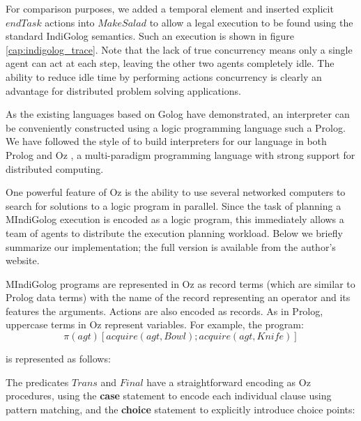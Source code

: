\documentclass[times, 10pt, twocolumn]{article}
\begin{document}
For comparison purposes, we added a temporal element and inserted
explicit $endTask$ actions into $MakeSalad$ to allow a legal execution
to be found using the standard IndiGolog semantics. Such an execution
is shown in figure \ref{cap:indigolog_trace}. Note that the lack
of true concurrency means only a single agent can act at each step,
leaving the other two agents completely idle. The ability to reduce
idle time by performing actions concurrency is clearly an advantage
for distributed problem solving applications.



As the existing languages based on Golog have demonstrated, an interpreter
can be conveniently constructed using a logic programming language
such a Prolog. We have followed the style of \cite{giacomo00congolog,giacomo99indigolog}
to build interpreters for our language in both Prolog and Oz \cite{vanroy03mozart_logic},
a multi-paradigm programming language with strong support for distributed
computing.

One powerful feature of Oz is the ability to use several networked
computers to search for solutions to a logic program in parallel.
Since the task of planning a MIndiGolog execution is encoded as a
logic program, this immediately allows a team of agents to distribute
the execution planning workload. Below we briefly summarize our implementation;
the full version is available from the author's website.

MIndiGolog programs are represented in Oz as record terms (which are
similar to Prolog data terms) with the name of the record representing
an operator and its features the arguments. Actions are also encoded
as records. As in Prolog, uppercase terms in Oz represent variables.
For example, the program:\[
\pi(agt)\left[acquire(agt,Bowl);acquire(agt,Knife)\right]\]


is represented as follows:

{\small  }{\small \par}

The predicates $Trans$ and $Final$ have a straightforward encoding
as Oz procedures, using the \textbf{case} statement to encode each
individual clause using pattern matching, and the \textbf{choice}
statement to explicitly introduce choice points:

{\small  }{\small \par}

{\small  }{\small \par}
\end{document}
